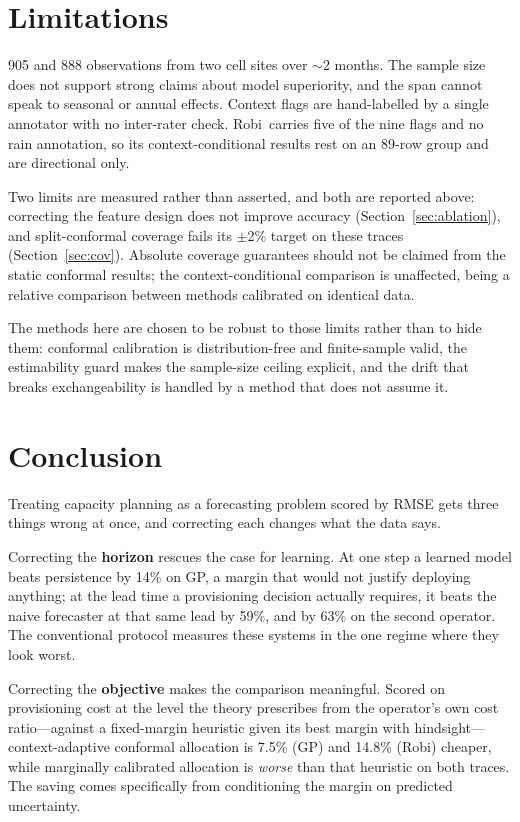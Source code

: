 \documentclass[conference]{IEEEtran}
\newcommand{\gpx}{GP}
\newcommand{\robix}{Robi}
\begin{document}
\section{Limitations}

905 and 888 observations from two cell sites over $\sim$2 months. The sample size does
not support strong claims about model superiority, and the span cannot speak to
seasonal or annual effects. Context flags are hand-labelled by a single annotator with
no inter-rater check. \robix\ carries five of the nine flags and no rain annotation, so
its context-conditional results rest on an 89-row group and are directional only.

Two limits are measured rather than asserted, and both are reported above: correcting
the feature design does not improve accuracy (Section~\ref{sec:ablation}), and
split-conformal coverage fails its $\pm 2\%$ target on these traces
(Section~\ref{sec:cov}). Absolute coverage guarantees should not be claimed from the
static conformal results; the context-conditional comparison is unaffected, being a
relative comparison between methods calibrated on identical data.

The methods here are chosen to be robust to those limits rather than to hide them:
conformal calibration is distribution-free and finite-sample valid, the estimability
guard makes the sample-size ceiling explicit, and the drift that breaks exchangeability
is handled by a method that does not assume it.

\section{Conclusion}

Treating capacity planning as a forecasting problem scored by RMSE gets three things
wrong at once, and correcting each changes what the data says.

Correcting the \textbf{horizon} rescues the case for learning. At one step a learned
model beats persistence by 14\% on \gpx, a margin that would not justify deploying
anything; at the lead time a provisioning decision actually requires, it beats the
naive forecaster at that same lead by 59\%, and by 63\% on the second operator. The
conventional protocol measures these systems in the one regime where they look worst.

Correcting the \textbf{objective} makes the comparison meaningful. Scored on
provisioning cost at the level the theory prescribes from the operator's own cost
ratio---against a fixed-margin heuristic given its best margin with
hindsight---context-adaptive conformal allocation is 7.5\% (\gpx) and 14.8\% (\robix)
cheaper, while marginally calibrated allocation is \emph{worse} than that heuristic on
both traces. The saving comes specifically from conditioning the margin on predicted
uncertainty.
\end{document}

